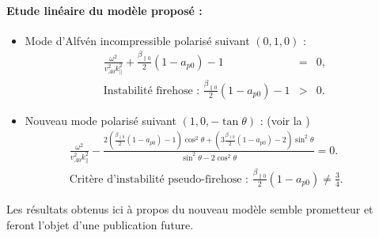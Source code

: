 {\begin{minipage}[c]{\linewidth}
\paragraph{Etude linéaire du modèle proposé : }
\begin{itemize}
    \item Mode d'Alfvén incompressible polarisé suivant $(0,1,0)$ :
\begin{eqnarray}
\label{eq:synth_lininc_disp1}    
  \frac{\omega^2}{v^2_{A0}k^2_{\parallel}} + \frac{\beta_{\parallel 0}}{2}(1-a_{p0})-1  &=&0,\\
\text{Instabilité firehose : } \frac{\beta_{\parallel 0}}{2}(1-a_{p0})-1 &>&0 .
\end{eqnarray} 
    \item Nouveau mode polarisé suivant $(1,0,- \tan \theta)$ : (voir la )
\begin{eqnarray}
\label{eq:synth_lininc_disp2}    
  \frac{\omega^2}{v^2_{A0}k^2_{\parallel}} - \frac{2(\frac{\beta_{\parallel 0}}{2}(1-a_{p0})-1)\cos^2 \theta 
  +  ( 3\frac{\beta_{\parallel 0}}{2}(1-a_{p0}) - 2) \sin^2 \theta}{\sin^2 \theta-2\cos^2 \theta}  =0. && \\
\text{Critère d'instabilité pseudo-firehose : }  \frac{\beta_{\parallel 0}}{2}(1-a_{p0}) \neq \frac{3}{4}. && 
\end{eqnarray} 
\end{itemize}


Les résultats obtenus ici à propos du nouveau modèle semble prometteur et feront l'objet d'une publication future. 
\end{minipage}}
